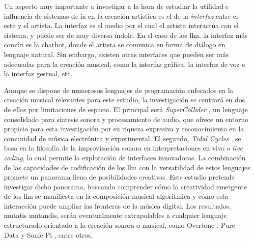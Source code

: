   
  
  
  
  


Un aspecto muy importante a investigar a la hora de estudiar la utilidad e influencia de sistemas de \gls{ia} en la creación artística es el de la \emph{interfaz} entre el este y el artista. La interfaz es el medio por el cual el artista interactúa con el sistema, y puede ser de muy diversa índole. En el caso de los \gls{llm}, la interfaz más común es la {chatbot}, donde el artista se comunica en forma de diálogo en lenguaje natural. Sin embargo, existen otras interfaces que pueden ser más adecuadas para la creación musical, como la interfaz gráfica, la interfaz de voz o la interfaz gestual, etc.

Aunque se dispone de numerosos lenguajes de programación enfocados en la creación musical relevantes para este estudio, la investigación se centrará en dos de ellos por limitaciones de espacio. El principal será \emph{SuperCollider} \citep{SupercolliderSupercollider2024}, un lenguaje consolidado para síntesis sonora y procesamiento de audio, que ofrece un entorno propicio para esta investigación por su riqueza expresiva y reconocimiento en la comunidad de música electrónica y experimental. El segundo, \emph{Tidal Cycles} \citep{LiveCodeTidal}, se basa en la filosofía de la improvisación sonora en interpretaciones en vivo o \emph{live coding}, lo cual permite la exploración de interfaces innovadoras. La combinación de las capacidades de codificación de los \gls{llm} con la versatilidad de estos lenguajes promete un panorama lleno de posibilidades creativas. Este estudio pretende investigar dicho panorama, buscando comprender cómo la creatividad emergente de los \gls{llm} se manifiesta en la composición musical algorítmica y cómo esta interacción puede ampliar las fronteras de la música digital. Los resultados, mutatis mutandis, serán eventualmente extrapolables a cualquier lenguaje estructurado orientado a la creación sonora o musical, como {Overtone} \citep{OvertoneCollaborativeProgrammable}, {Pure Data} \citep{PureDataPd} y {Sonic Pi} \citep{SonicPiLive}, entre otros.

